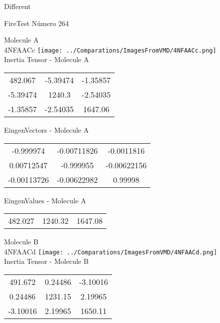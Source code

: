 \begin{center}
\vtab
\vtab
\textcolor{NavyBlue}{\Large Different}
\end{center}

 \newpage

\vtab[-2cm]
\begin{center}
{\large FireTest \tab Número 264}
\end{center}
\begin{multicols}{2}
\begin{center}

Molecule A \\ 
4NFAACc
\texttt{[image: ../Comparations/ImagesFromVMD/4NFAACc.png]}
\\
Inertia Tensor - Molecule A \\
\vtab

\begin{tabular}{|c c c|}
482.067	 & 	-5.39474	 & 	-1.35857	 \\
-5.39474	 & 	1240.3	 & 	-2.54035	 \\
-1.35857	 & 	-2.54035	 & 	1647.06
\end{tabular}

\vtab
 EingenVectors - Molecule A     \\
\vtab
\begin{tabular}{|c c c|}
-0.999974	 & 	-0.00711826	 & 	-0.0011816	 \\
0.00712547	 & 	-0.999955	 & 	-0.00622156	 \\
-0.00113726	 & 	-0.00622982	 & 	0.99998
\end{tabular}

\vtab
 EingenValues - Molecule A     \\
\vtab
\begin{tabular}{|c c c|}
482.027	 & 	1240.32	 & 	1647.08	 \\
\end{tabular}
\columnbreak

Molecule B \\ 
4NFAACd
\texttt{[image: ../Comparations/ImagesFromVMD/4NFAACd.png]}
\\
Inertia Tensor - Molecule B \\
\vtab

\begin{tabular}{|c c c|}
491.672	 & 	0.24486	 & 	-3.10016	 \\
0.24486	 & 	1231.15	 & 	2.19965	 \\
-3.10016	 & 	2.19965	 & 	1650.11
\end{tabular}


\end{center}
\end{multicols}
